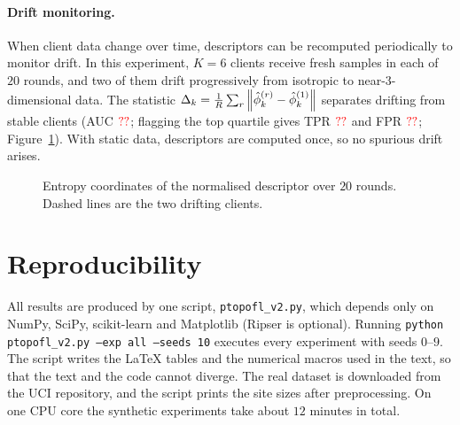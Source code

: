 \paragraph{Drift monitoring.}
When client data change over time, descriptors can be recomputed periodically to monitor
drift. In this experiment, $K=6$ clients receive fresh samples in each of $20$ rounds, and
two of them drift progressively from isotropic to near-$3$-dimensional data. The statistic
$\Delta_k=\frac1R\sum_r\left\lVert \hat\phi_k^{(r)}-\hat\phi_k^{(1)} \right\rVert$ separates drifting from
stable clients (AUC $\textcolor{red}{??}$; flagging the top quartile gives TPR $\textcolor{red}{??}$ and FPR
$\textcolor{red}{??}$; Figure~\ref{fig:continual}). With static data, descriptors are computed once,
so no spurious drift arises.

\begin{figure}[h]
\centering
{}
\caption{Entropy coordinates of the normalised descriptor over $20$ rounds. Dashed lines are
the two drifting clients.}
\label{fig:continual}
\end{figure}

\section{Reproducibility}
\label{app:repro}
All results are produced by one script, \texttt{ptopofl\_v2.py}, which depends only on
NumPy, SciPy, scikit-learn and Matplotlib (Ripser is optional). Running
\texttt{python ptopofl\_v2.py --exp all --seeds 10} executes every experiment with seeds
$0$--$9$. The script writes the \LaTeX{} tables and the numerical macros used in the text,
so that the text and the code cannot diverge. The real dataset is downloaded from the UCI
repository, and the script prints the site sizes after preprocessing. On one CPU core the
synthetic experiments take about $12$ minutes in total.
\codeavailability
